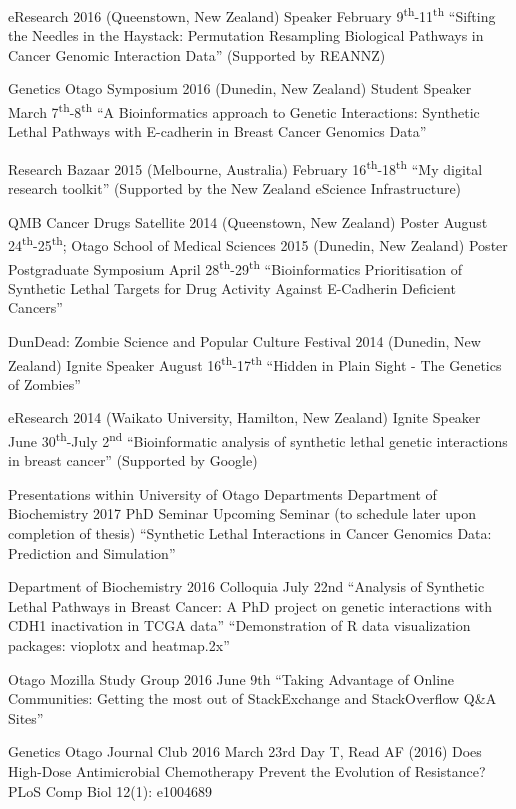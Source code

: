 eResearch 2016 (Queenstown, New Zealand) Speaker February 9\textsuperscript{th}-11\textsuperscript{th}
``Sifting the Needles in the Haystack: Permutation Resampling Biological Pathways in Cancer Genomic Interaction Data'' (Supported by REANNZ)

Genetics Otago Symposium 2016 (Dunedin, New Zealand) Student Speaker March 7\textsuperscript{th}-8\textsuperscript{th} 
``A Bioinformatics approach to Genetic Interactions: Synthetic Lethal Pathways with E-cadherin in Breast Cancer Genomics Data''

Research Bazaar 2015 (Melbourne, Australia) February 16\textsuperscript{th}-18\textsuperscript{th}
``My digital research toolkit'' (Supported by the New Zealand eScience Infrastructure)


QMB Cancer Drugs Satellite 2014 (Queenstown, New Zealand) Poster August 24\textsuperscript{th}-25\textsuperscript{th};
Otago School of Medical Sciences 2015 (Dunedin, New Zealand) Poster Postgraduate Symposium April 28\textsuperscript{th}-29\textsuperscript{th}
“Bioinformatics Prioritisation of Synthetic Lethal Targets for Drug Activity Against E-Cadherin Deficient Cancers”

DunDead: Zombie Science and Popular Culture Festival 2014 (Dunedin, New Zealand) Ignite Speaker August 16\textsuperscript{th}-17\textsuperscript{th}
``Hidden in Plain Sight - The Genetics of Zombies''


eResearch 2014 (Waikato University, Hamilton, New Zealand) Ignite Speaker June 30\textsuperscript{th}-July 2\textsuperscript{nd}
``Bioinformatic analysis of synthetic lethal genetic interactions in breast cancer'' (Supported by Google)

\fi

\iffalse
Presentations within University of Otago Departments
Department of Biochemistry 2017 PhD Seminar
Upcoming Seminar (to schedule later upon completion of thesis)
``Synthetic Lethal Interactions in Cancer Genomics Data: Prediction and Simulation''

Department of Biochemistry 2016 Colloquia July 22nd
``Analysis of Synthetic Lethal Pathways in Breast Cancer: A PhD project on genetic interactions with CDH1 inactivation in TCGA data''
``Demonstration of R data visualization packages: vioplotx and heatmap.2x''

Otago Mozilla Study Group 2016 June 9th
``Taking Advantage of Online Communities: Getting the most out of StackExchange and StackOverflow Q&A Sites''

Genetics Otago Journal Club 2016 March 23rd 
Day T, Read AF (2016) Does High-Dose Antimicrobial Chemotherapy Prevent the Evolution of Resistance? PLoS Comp Biol 12(1): e1004689

